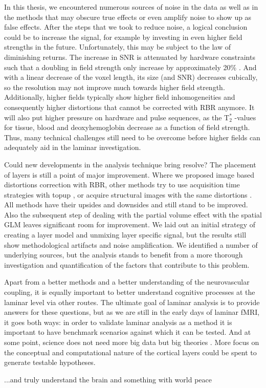 In this thesis, we encountered numerous sources of noise in the data as well as in the methods that may obscure true effects or even amplify noise to show up as false effects. After the steps that we took to reduce noise, a logical conclusion could be to increase the signal, for example by investing in even higher field strengths in the future. Unfortunately, this may be subject to the law of diminishing returns. The increase in SNR is attenuated by hardware constraints such that a doubling in field strength only increase by approximately 20\% \cite{?}. 
And with a linear decrease of the voxel length, its size (and SNR) decreases cubically, so the resolution may not improve much towards higher field strength. Additionally, higher fields typically show higher field inhomogeneities and consequently higher distortions that cannot be corrected with RBR anymore. It will also put higher pressure on hardware and pulse sequences, as the T$_2^*$ -values for tissue, blood and deoxyhemoglobin decrease as a function of field strength. Thus, many technical challenges still need to be overcome before higher fields can adequately aid in the laminar investigation.

Could new developments in the analysis technique bring resolve? The placement of layers is still a point of major improvement. Where we proposed image based distortions correction with RBR, other methods try to use acquisition time strategies with topup \cite{Smith2004}, or acquire structural images with the same distortions \cite{Kashyap2017}. All methods have their upsides and downsides and still stand to be improved. Also the subsequent step of dealing with the partial volume effect with the spatial GLM leaves significant room for improvement. We laid out an initial strategy of creating a layer model and unmixing layer specific signal, but the results still show methodological artifacts and noise amplification. We identified a number of underlying sources, but the analysis stands to benefit from a more thorough investigation and quantification of the factors that contribute to this problem. 

Apart from a better methods and a better understanding of the neurovascular coupling, it is equally important to better understand cognitive processes at the laminar level via other routes. The ultimate goal of laminar analysis is to provide answers for these questions, but as we are still in the early days of laminar fMRI, it goes both ways: in order to validate laminar analysis as a method it is important to have benchmark scenarios against which it can be tested. And at some point, science does not need more big data but big theories \cite{Jensen2014}. More focus on the conceptual and computational nature of the cortical layers could be spent to generate testable hypotheses.







...and truly understand the brain and something with world peace
